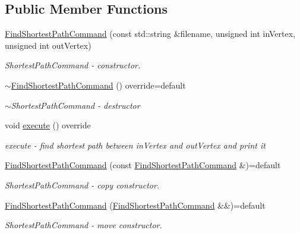 \subsection*{Public Member Functions}
\begin{DoxyCompactItemize}
\item 
\hyperlink{classmin__path_1_1command__handler_1_1_find_shortest_path_command_a50a520c9a9fd4b962757be360b5e344f}{Find\+Shortest\+Path\+Command} (const std\+::string \&filename, unsigned int in\+Vertex, unsigned int out\+Vertex)
\begin{DoxyCompactList}\small\item\em Shortest\+Path\+Command -\/ constructor. \end{DoxyCompactList}\item 
\hyperlink{classmin__path_1_1command__handler_1_1_find_shortest_path_command_a69d019f4373486c4bf105dedc534271a}{$\sim$\+Find\+Shortest\+Path\+Command} () override=default
\begin{DoxyCompactList}\small\item\em $\sim$\+Shortest\+Path\+Command -\/ destructor \end{DoxyCompactList}\item 
void \hyperlink{classmin__path_1_1command__handler_1_1_find_shortest_path_command_a517885dc57466a93a07d04ddfb68852d}{execute} () override
\begin{DoxyCompactList}\small\item\em execute -\/ find shortest path between in\+Vertex and out\+Vertex and print it \end{DoxyCompactList}\item 
\hyperlink{classmin__path_1_1command__handler_1_1_find_shortest_path_command_a32c4bc563cd2109125f3b3a1ba291409}{Find\+Shortest\+Path\+Command} (const \hyperlink{classmin__path_1_1command__handler_1_1_find_shortest_path_command}{Find\+Shortest\+Path\+Command} \&)=default
\begin{DoxyCompactList}\small\item\em Shortest\+Path\+Command -\/ copy constructor. \end{DoxyCompactList}\item 
\hyperlink{classmin__path_1_1command__handler_1_1_find_shortest_path_command_ab2a6cd9a8f8192c12d0bd3d3579a51dc}{Find\+Shortest\+Path\+Command} (\hyperlink{classmin__path_1_1command__handler_1_1_find_shortest_path_command}{Find\+Shortest\+Path\+Command} \&\&)=default
\begin{DoxyCompactList}\small\item\em Shortest\+Path\+Command -\/ move constructor. \end{DoxyCompactList}\item 

\end{DoxyCompactItemize}
